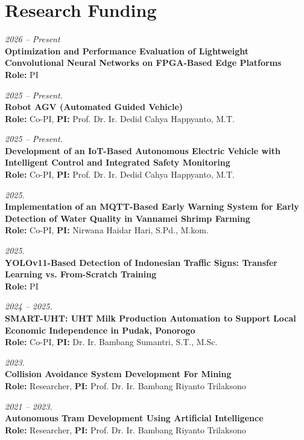 \section{Research Funding}

\vspace{6pt}
\textit{2026 -- Present} \\
\textbf{Optimization and Performance Evaluation of Lightweight Convolutional Neural Networks on FPGA-Based Edge Platforms} \\
\textbf{Role:} PI

\vspace{6pt}
\textit{2025 -- Present.} \\
\textbf{Robot AGV (Automated Guided Vehicle)} \\
\textbf{Role:} Co-PI, \quad \textbf{PI:} Prof. Dr. Ir. Dedid Cahya Happyanto, M.T.

\vspace{6pt}
\textit{2025 -- Present.} \\
\textbf{Development of an IoT-Based Autonomous Electric Vehicle with Intelligent Control and Integrated Safety Monitoring} \\
\textbf{Role:} Co-PI, \quad \textbf{PI:} Prof. Dr. Ir. Dedid Cahya Happyanto, M.T.

\vspace{6pt}
\textit{2025.} \\
\textbf{Implementation of an MQTT-Based Early Warning System for Early Detection of Water Quality in Vannamei Shrimp Farming} \\
\textbf{Role:} Co-PI, \quad \textbf{PI:} Nirwana Haidar Hari, S.Pd., M.kom.

\vspace{6pt}
\textit{2025.} \\
\textbf{YOLOv11-Based Detection of Indonesian Traffic Signs: Transfer Learning vs. From-Scratch Training} \\
\textbf{Role:} PI

\vspace{6pt}
\textit{2024 -- 2025.} \\
\textbf{SMART-UHT: UHT Milk Production Automation to Support Local Economic Independence in Pudak, Ponorogo} \\
\textbf{Role:} Co-PI, \quad \textbf{PI:} Dr. Ir. Bambang Sumantri, S.T., M.Sc.

\vspace{6pt}
\textit{2023.} \\
\textbf{Collision Avoidance System Development For Mining} \\
\textbf{Role:} Researcher, \quad \textbf{PI:} Prof. Dr. Ir. Bambang Riyanto Trilaksono

\vspace{6pt}
\textit{2021 -- 2023.} \\
\textbf{Autonomous Tram Development Using Artificial Intelligence} \\
\textbf{Role:} Researcher, \quad \textbf{PI:} Prof. Dr. Ir. Bambang Riyanto Trilaksono
